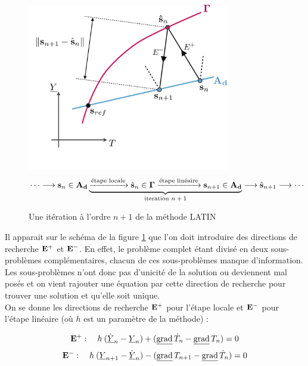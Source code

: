 \documentclass[12pt,a4paper]{report}
\begin{document}
\begin{figure}[!htb]
\centering
\includegraphics[width=8.8cm]{LATIN.figure/latin_iter_n1}
\begin{equation}
   \cdots\longrightarrow
   \mathbf{s}_{n}\in\mathbf{A_d}
   \underbrace{
   \xrightarrow{\text{étape locale}}
   \hat{\mathbf{s}}_{n}\in\mbox{$\boldsymbol{\Gamma}$}
   \xrightarrow{\text{étape linéaire}}
   \mathbf{s}_{n+1}\in\mathbf{A_d}
   }_\text{iteration $n+1$}
   \longrightarrow
   \hat{\mathbf{s}}_{n+1}
   \longrightarrow\cdots
\end{equation}
\caption{Une itération à l'ordre $n+1$ de la méthode LATIN\label{Latin_schema}}
\end{figure}


Il apparait sur le schéma de la figure \ref{Latin_schema} que l'on doit introduire des \og  directions de recherche\fg{} $\mathbf{E^+}$ et $\mathbf{E^-}$. En effet, le problème complet étant divisé en deux sous-problèmes complémentaires, chacun de ces sous-problèmes manque d'information. Les sous-problèmes n'ont donc pas d'unicité de la solution ou deviennent mal posés et on vient rajouter une équation par cette direction de recherche pour trouver une solution et qu'elle soit unique.\\
 On se donne les directions de recherche $\mathbf{E^+}$ pour l'étape locale et $\mathbf{E^-}$ pour l'étape linéaire (où $h$ est un paramètre de la méthode) :

\begin{equation}\label{dir_rech+}
\rechp:  \quad h\: (\hat{\Ys}_n-\Ys_n)+ (\gradv{\hat{T}_n}-\gradv{T_n}) = 0
\end{equation}
\begin{equation}\label{dir_rech-}
\rechm :  \quad h\: (\Ys_{n+1}-\hat{\Ys}_n)- (\gradv{T}_{n+1}-\gradv{\hat{T}}_n) = 0
\end{equation}\\
\end{document}
